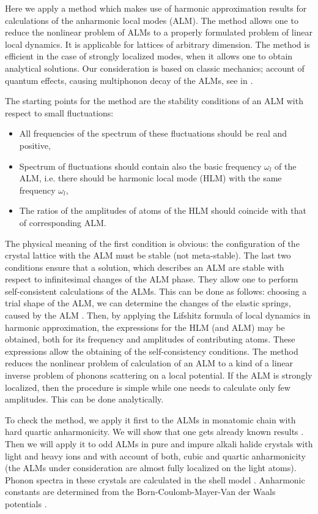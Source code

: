 Here we apply a method which makes use of harmonic approximation results
for calculations of the anharmonic local modes (ALM). The method 
allows one to reduce the nonlinear problem of ALMs to a properly 
formulated problem of linear local dynamics. It is applicable for lattices of 
arbitrary dimension. The method is efficient in the case of strongly 
localized modes, when it allows one to obtain analytical solutions. Our 
consideration is based on classic mechanics; account of quantum effects,
causing multiphonon decay of the ALMs, see in \cite{hizhrev,hizhnev}. 

The starting points for the method are the stability conditions of an
ALM with respect to small fluctuations:
\begin{itemize}
\item
All frequencies of the spectrum of these fluctuations should be real and  
positive,  
\item
Spectrum of fluctuations should contain also the basic frequency $\omega_l$ of
the ALM, i.e. there should be harmonic local mode (HLM) with the same 
frequency $\omega_l$, 
\item
The ratios of the amplitudes of atoms of the HLM should coincide with that of 
corresponding ALM.  
\end{itemize}

The physical meaning of the first condition  is obvious: the configuration 
of the crystal lattice with the ALM must be stable (not meta-stable). 
The last two conditions ensure that a solution, which describes  
an ALM are stable  with respect to infinitesimal changes of the ALM phase. 
They allow one to perform self-consistent calculations
of the ALMs. This can be done as follows:
choosing a trial shape of the ALM, we can determine the changes
of the elastic springs, caused by the ALM \cite{kisgap}. 
Then, by applying  the Lifshitz formula
of local dynamics in harmonic approximation, the expressions for the
HLM (and ALM) may be obtained, both for its frequency and amplitudes of 
contributing atoms. These expressions allow the obtaining
of the self-consistency conditions. The method  reduces the nonlinear 
problem of 
calculation of an ALM to a kind of a linear inverse problem of phonons 
scattering on a local potential. If the ALM is strongly localized, then 
the procedure is simple while one needs to calculate only few amplitudes. 
This can be done analytically. 


To check the method, we apply it first to the ALMs in monatomic chain 
with hard quartic anharmonicity. We will show that one gets
already known  results \cite{sivtak,page}.
Then we will apply it to odd ALMs in pure and impure  
alkali halide crystals with light and heavy ions and with account of both,  
cubic and quartic anharmonicity (the ALMs under consideration are almost fully
localized on the light atoms). Phonon spectra in these crystals are 
calculated in the shell model \cite{shell,bilz,kristofel}.
Anharmonic constants are determined from the Born-Coulomb-Mayer-Van der
Waals potentials \cite{potential}. 


